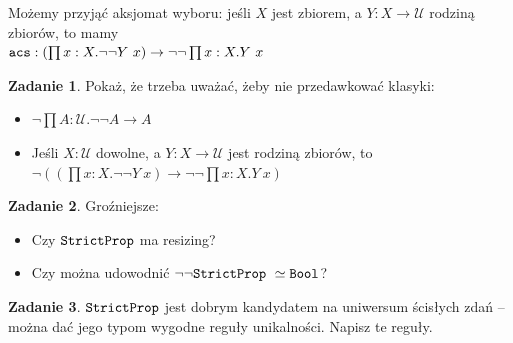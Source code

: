 \documentclass[11pt]{article}
\theoremstyle{definition}
\newtheorem{exercise}{Zadanie}[section]
\newcommand{\txt}[1]{\texttt{#1}}
\renewcommand{\(}{\left(}
\renewcommand{\)}{\right)}
\newcommand{\U}{\mathcal{U}}
\newcommand{\apl}[2]{#1\ #2}
\newcommand{\hequiv}[2]{#1 \simeq #2}
\newcommand{\dprod}[2]{\prod #1.#2}
\begin{document}
\begin{center}
Możemy przyjąć aksjomat wyboru: jeśli $X$ jest zbiorem, a $Y : X \to \U$ rodziną zbiorów, to mamy \\

$\acs : (\dprod{x : X}{\neg \neg \apl{Y}{x}}) \to \neg \neg \dprod{x : X}{\apl{Y}{x}}$

\end{center}

\begin{exercise}
  Pokaż, że trzeba uważać, żeby nie przedawkować klasyki:

  \begin{itemize}
    \item $\neg \dprod{A : \U}{\neg \neg A \to A}$
    \item Jeśli $X : \U$ dowolne, a $Y : X \to \U$ jest rodziną zbiorów, to \\ $\neg \((\dprod{x : X}{\neg \neg \apl{Y}{x}}) \to \neg \neg \dprod{x : X}{\apl{Y}{x}} \)$
  \end{itemize}
\end{exercise}

\begin{exercise}
  Groźniejsze:

  \begin{itemize}
    \item Czy $\StrictProp$ ma resizing?
    \item Czy można udowodnić $\neg \neg \StrictProp \hequiv\ \txt{Bool}$?
  \end{itemize}
\end{exercise}

\begin{exercise}
  $\StrictProp$ jest dobrym kandydatem na uniwersum ścisłych zdań -- można dać jego typom wygodne reguły unikalności. Napisz te reguły.
\end{exercise}
\end{document}
